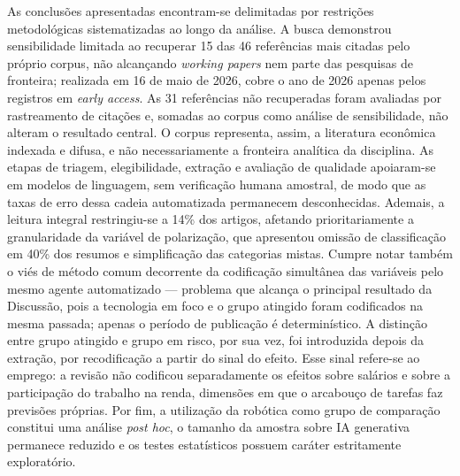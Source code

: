 
As conclusões apresentadas encontram-se delimitadas por restrições metodológicas sistematizadas ao longo da análise. A busca demonstrou sensibilidade limitada ao recuperar 15 das 46 referências mais citadas pelo próprio corpus, não alcançando \textit{working papers} nem parte das pesquisas de fronteira; realizada em 16 de maio de 2026, cobre o ano de 2026 apenas pelos registros em \textit{early access}. As 31 referências não recuperadas foram avaliadas por rastreamento de citações e, somadas ao corpus como análise de sensibilidade, não alteram o resultado central. O corpus representa, assim, a literatura econômica indexada e difusa, e não necessariamente a fronteira analítica da disciplina. As etapas de triagem, elegibilidade, extração e avaliação de qualidade apoiaram-se em modelos de linguagem, sem verificação humana amostral, de modo que as taxas de erro dessa cadeia automatizada permanecem desconhecidas. Ademais, a leitura integral restringiu-se a 14\% dos artigos, afetando prioritariamente a granularidade da variável de polarização, que apresentou omissão de classificação em 40\% dos resumos e simplificação das categorias mistas. Cumpre notar também o viés de método comum decorrente da codificação simultânea das variáveis pelo mesmo agente automatizado --- problema que alcança o principal resultado da Discussão, pois a tecnologia em foco e o grupo atingido foram codificados na mesma passada; apenas o período de publicação é determinístico. A distinção entre grupo atingido e grupo em risco, por sua vez, foi introduzida depois da extração, por recodificação a partir do sinal do efeito. Esse sinal refere-se ao emprego: a revisão não codificou separadamente os efeitos sobre salários e sobre a participação do trabalho na renda, dimensões em que o arcabouço de tarefas faz previsões próprias. Por fim, a utilização da robótica como grupo de comparação constitui uma análise \textit{post hoc}, o tamanho da amostra sobre IA generativa permanece reduzido e os testes estatísticos possuem caráter estritamente exploratório.


